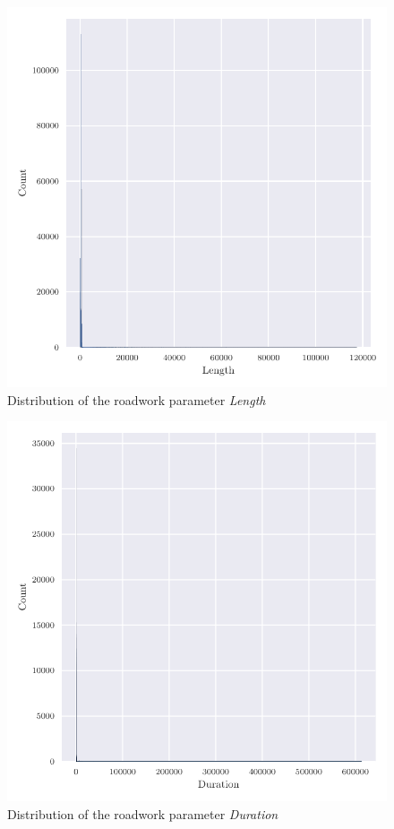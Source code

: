     \begin{figure}[ht!]
        \centering
        \includegraphics[scale=0.7]{CorrAnalysis/data/ArbIS/01_dataset/plots/arbis_dataset_dist_Length}
        \caption{Distribution of the roadwork parameter \textit{Length}}
        \label{img:arbis_matched_Length}
    \end{figure}

    \begin{figure}[ht!]
        \centering
        \includegraphics[scale=0.7]{CorrAnalysis/data/ArbIS/01_dataset/plots/arbis_dataset_dist_Duration}
        \caption{Distribution of the roadwork parameter \textit{Duration}}
        \label{img:arbis_matched_Duration}
    \end{figure}

